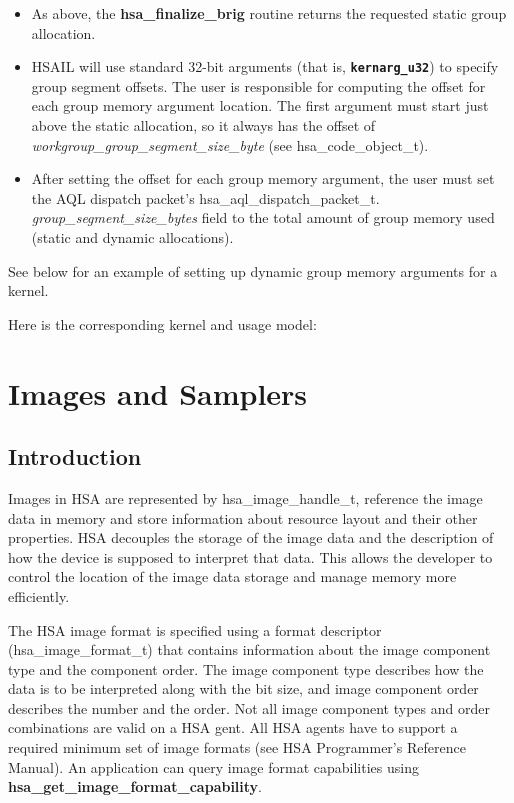 \documentclass{book}
\newcommand{\diffblock}[1]{#1}
\newcommand{\ttbf}[1]{\diffblock{\texttt{\textbf{#1}}}}
\newcommand{\reffun}[1]{\textbf{#1}}
\newcommand{\reffld}[1]{\textit{#1}}
\newcommand{\reftyp}[1]{#1}
\begin{document}
\begin{appendices}
\begin{itemize}
\item As above, the \reffun{hsa\_finalize\_brig} routine returns the
requested static group allocation.

\item HSAIL will use standard 32-\/bit arguments (that is,
\ttbf{kernarg\_u32}) to specify group segment offsets. The user is
responsible for computing the offset for each group memory argument
location. The first argument must start just above the static
allocation, so it always has the offset of \reffld{workgroup\_group\_segment\_size\_byte} (see \reftyp{hsa\_code\_object\_t}).

\item After setting the offset for each group memory argument, the
  user must set the AQL dispatch packet's
  \reftyp{hsa\_aql\_dispatch\_packet\_t}.\reffld{
    group\_segment\_size\_bytes} field to the total amount of group
  memory used (static and dynamic allocations).

\end{itemize}

See below for an example of setting up dynamic group memory
arguments for a kernel.


Here is the corresponding kernel and usage model:



\chapter{Images and Samplers}
\label{images} \hypertarget{images}{}
\hypertarget{Images}{\section{Introduction} \label{images}}

Images in HSA are represented by \reftyp{hsa\_image\_handle\_t}, reference the
image data in memory and store information about resource layout and
their other properties. HSA decouples the storage of the image data
and the description of how the device is supposed to interpret that
data. This allows the developer to control the location of the image
data storage and manage memory more efficiently.

The HSA image format is specified using a format descriptor
(\reftyp{hsa\_image\_format\_t}) that contains information about the image
component type and the component order. The image component type
describes how the data is to be interpreted along with the bit size,
and image component order describes the number and the order. Not all
image component types and order combinations are valid on a HSA
gent. All HSA agents have to support a required minimum set of image
formats (see HSA Programmer’s Reference Manual). An application can
query image format capabilities using
\reffun{hsa\_get\_image\_format\_capability}.


\end{appendices}
\end{document}
